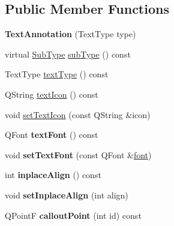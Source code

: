 \subsection*{Public Member Functions}
\begin{DoxyCompactItemize}
\item 
\mbox{\label{class_poppler_1_1_text_annotation_a0e82da942696ad4ecc14d4ee36b67f7c}} 
{\bfseries Text\+Annotation} (Text\+Type type)
\item 
virtual \hyperlink{class_poppler_1_1_annotation_a2d592999c330949d64679cfa9e81113f}{Sub\+Type} \hyperlink{class_poppler_1_1_text_annotation_aa2c1926b6e06b1527a43f651fea34aaa}{sub\+Type} () const
\item 
Text\+Type \hyperlink{class_poppler_1_1_text_annotation_a6ef10f14b9adf144fe46f9266daa402e}{text\+Type} () const
\item 
Q\+String \hyperlink{class_poppler_1_1_text_annotation_a1d54335a003edf713781fa43fc5f4ac5}{text\+Icon} () const
\item 
void \hyperlink{class_poppler_1_1_text_annotation_a6dd7e7857f5ef306d4f0829b7abfa4f4}{set\+Text\+Icon} (const Q\+String \&icon)
\item 
\mbox{\label{class_poppler_1_1_text_annotation_af069955621858652405a5f83715c8f75}} 
Q\+Font {\bfseries text\+Font} () const
\item 
\mbox{\label{class_poppler_1_1_text_annotation_a66b3a83884227198815bdf6cda758939}} 
void {\bfseries set\+Text\+Font} (const Q\+Font \&\hyperlink{structfont}{font})
\item 
\mbox{\label{class_poppler_1_1_text_annotation_aca1b48b7c1b7ef5eede7f3149e23a0f2}} 
int {\bfseries inplace\+Align} () const
\item 
\mbox{\label{class_poppler_1_1_text_annotation_a107ebd8c04fc3fb4186175f815beebac}} 
void {\bfseries set\+Inplace\+Align} (int align)
\item 
\mbox{\label{class_poppler_1_1_text_annotation_aab0a7d55c195866f4de925112467d56d}} 
Q\+PointF {\bfseries callout\+Point} (int id) const
\item 

\end{DoxyCompactItemize}
